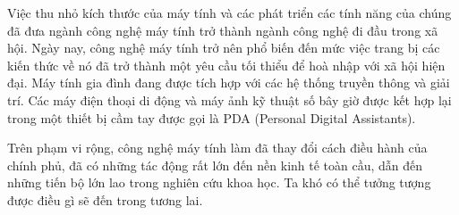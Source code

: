 Việc thu nhỏ kích thước của máy tính và các phát triển các tính năng của chúng đã đưa
ngành công nghệ máy tính trở thành ngành công nghệ đi đầu trong xã hội. Ngày nay, công
nghệ máy tính trở nên phổ biến đến mức việc trang bị các kiến thức về nó đã trở thành một
yêu cầu tối thiểu để hoà nhập với xã hội hiện đại. Máy tính gia đình đang được tích hợp
với các hệ thống truyền thông và giải trí. Các máy điện thoại di động và máy ảnh kỹ thuật
số bây giờ được kết hợp lại trong một thiết bị cầm tay được gọi là PDA (Personal Digital
Assistants).

Trên phạm vi rộng, công nghệ máy tính làm đã thay đổi cách điều hành của chính phủ, đã có
những tác động rất lớn đến nền kinh tế toàn cầu, dẫn đến những tiến bộ lớn lao trong
nghiên cứu khoa học. Ta khó có thể tưởng tượng được điều gì sẽ đến trong tương lai.


